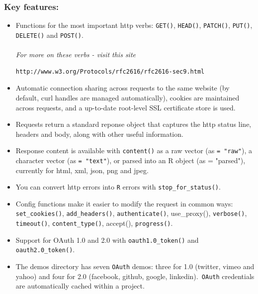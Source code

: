 \subsubsection*{Key features:}
\begin{itemize}
\item Functions for the most important http verbs: \texttt{GET()}, \texttt{HEAD()}, \texttt{PATCH()}, \texttt{PUT()}, \texttt{DELETE()} and \texttt{POST()}.
\\
\\
\textit{For more on these verbs - visit this site}
\begin{verbatim}
http://www.w3.org/Protocols/rfc2616/rfc2616-sec9.html
\end{verbatim}

\item Automatic connection sharing across requests to the same website (by default, curl handles are managed automatically), cookies are maintained across requests, and a up-to-date root-level SSL certificate store is used.

\item Requests return a standard reponse object that captures the http status line, headers and body, along with other useful information.

\item Response content is available with \texttt{content()} as a raw vector (as \texttt{= "raw"}), a character vector (as \texttt{= "text"}), or parsed into an R object (as = "parsed"), currently for html, xml, json, png and jpeg.

\item You can convert http errors into \texttt{R} errors with \texttt{stop\_for\_status()}.

\item Config functions make it easier to modify the request in common ways: \texttt{set\_cookies()}, \texttt{add\_headers()}, \texttt{authenticate()}, use\_proxy(), \texttt{verbose()}, \texttt{timeout()}, \texttt{content\_type()}, accept(), \texttt{progress()}.

\item Support for OAuth 1.0 and 2.0 with \texttt{oauth1.0\_token()} and \texttt{oauth2.0\_token()}. 

\item The demos directory has seven \texttt{OAuth} demos: three for 1.0 (twitter, vimeo and yahoo) and four for 2.0 (facebook, github, google, linkedin).\texttt{ OAuth} credentials are automatically cached within a project.
\end{itemize}

